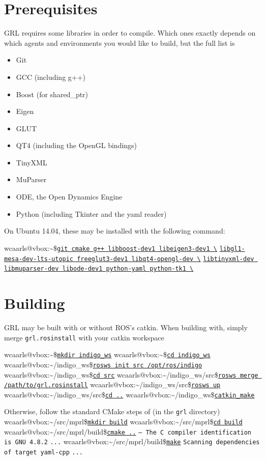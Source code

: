 \documentclass{article}
\makeatletter
\newcommand{\inp}[1]{\texttt{\underline{#1}}}
\newcommand{\txt}[1]{\texttt{#1}}
\newcommand{\promptm}{wcaarls@vbox:\~{}/src/mprl\$\xspace}
\newcommand{\promptmb}{wcaarls@vbox:\~{}/src/mprl/build\$\xspace}
\newcommand{\prompt}{wcaarls@vbox:\~{}\$\xspace}
\newcommand{\prompth}{wcaarls@vbox:\~{}/indigo\_ws\$\xspace}
\newcommand{\prompths}{wcaarls@vbox:\~{}/indigo\_ws/src\$\xspace}
\newenvironment{code}{\alltt}{\endalltt}
\makeatother
\begin{document}
\section{Prerequisites}

GRL requires some libraries in order to compile. Which ones exactly depends
on which agents and environments you would like to build, but the full list
is

\begin{itemize}
  \item Git
  \item GCC (including g++)
  \item Boost (for shared\_ptr)
  \item Eigen
  \item GLUT
  \item QT4 (including the OpenGL bindings)
  \item TinyXML
  \item MuParser
  \item ODE, the Open Dynamics Engine
  \item Python (including Tkinter and the yaml reader)
\end{itemize}

On Ubuntu 14.04, these may be installed with the following command:

\begin{code}
\prompt \inp{git cmake g++ libboost-dev1 libeigen3-dev1 \textbackslash}
\inp{libgl1-mesa-dev-lts-utopic freeglut3-dev1 libqt4-opengl-dev \textbackslash}
\inp{libtinyxml-dev libmuparser-dev libode-dev1 python-yaml python-tk1 \textbackslash}
\end{code}

\section{Building}

GRL may be built with or without ROS's catkin. When building with, simply
merge \txt{grl.rosinstall} with your catkin workspace

\begin{code}
{\color{Gray}\prompt \inp{mkdir indigo\_ws}
\prompt \inp{cd indigo\_ws}
\prompth \inp{rosws init src /opt/ros/indigo}
\prompth \inp{cd src}}
\prompths \inp{rosws merge /path/to/grl.rosinstall} 
\prompths \inp{rosws up}
\prompths \inp{cd ..}
\prompth \inp{catkin\_make}
\end{code}

Otherwise, follow the standard CMake steps of (in the \txt{grl} directory)
\begin{code}
\promptm \inp{mkdir build}
\promptm \inp{cd build}
\promptmb \inp{cmake ..}
\txt{-- The C compiler identification is GNU 4.8.2}
\txt{...}
\promptmb \inp{make}
\txt{Scanning dependencies of target yaml-cpp}
\txt{...}
\end{code}
\end{document}
